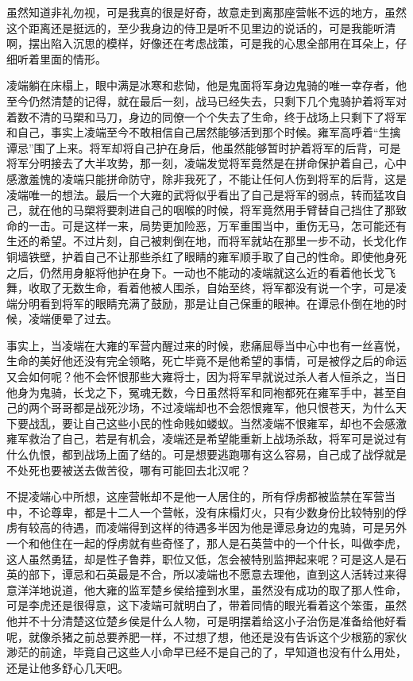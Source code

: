虽然知道非礼勿视，可是我真的很是好奇，故意走到离那座营帐不远的地方，虽然这个距离还是挺远的，至少我身边的侍卫是听不见里边的说话的，可是我能听清啊，摆出陷入沉思的模样，好像还在考虑战策，可是我的心思全部用在耳朵上，仔细听着里面的情形。

凌端躺在床榻上，眼中满是冰寒和悲恸，他是鬼面将军身边鬼骑的唯一幸存者，他至今仍然清楚的记得，就在最后一刻，战马已经失去，只剩下几个鬼骑护着将军对着数不清的马槊和马刀，身边的同僚一个个失去了生命，终于战场上只剩下了将军和自己，事实上凌端至今不敢相信自己居然能够活到那个时候。雍军高呼着“生擒谭忌”围了上来。将军却将自己护在身后，他虽然能够暂时护着将军的后背，可是将军分明接去了大半攻势，那一刻，凌端发觉将军竟然是在拼命保护着自己，心中感激羞愧的凌端只能拼命防守，除非我死了，不能让任何人伤到将军的后背，这是凌端唯一的想法。最后一个大雍的武将似乎看出了自己是将军的弱点，转而猛攻自己，就在他的马槊将要刺进自己的咽喉的时候，将军竟然用手臂替自己挡住了那致命的一击。可是这样一来，局势更加险恶，万军重围当中，重伤无马，怎可能还有生还的希望。不过片刻，自己被刺倒在地，而将军就站在那里一步不动，长戈化作铜墙铁壁，护着自己不让那些杀红了眼睛的雍军顺手取了自己的性命。即使他身死之后，仍然用身躯将他护在身下。一动也不能动的凌端就这么近的看着他长戈飞舞，收取了无数生命，看着他被人围杀，自始至终，将军都没有说一个字，可是凌端分明看到将军的眼睛充满了鼓励，那是让自己保重的眼神。在谭忌仆倒在地的时候，凌端便晕了过去。

事实上，当凌端在大雍的军营内醒过来的时候，悲痛屈辱当中心中也有一丝喜悦，生命的美好他还没有完全领略，死亡毕竟不是他希望的事情，可是被俘之后的命运又会如何呢？他不会怀恨那些大雍将士，因为将军早就说过杀人者人恒杀之，当日他身为鬼骑，长戈之下，冤魂无数，今日虽然将军和同袍都死在雍军手中，甚至自己的两个哥哥都是战死沙场，不过凌端却也不会怨恨雍军，他只恨苍天，为什么天下要战乱，要让自己这些小民的性命贱如蝼蚁。当然凌端不恨雍军，却也不会感激雍军救治了自己，若是有机会，凌端还是希望能重新上战场杀敌，将军可是说过有什么仇恨，都到战场上面了结的。可是想要逃跑哪有这么容易，自己成了战俘就是不处死也要被送去做苦役，哪有可能回去北汉呢？

不提凌端心中所想，这座营帐却不是他一人居住的，所有俘虏都被监禁在军营当中，不论尊卑，都是十二人一个营帐，没有床榻灯火，只有少数身份比较特别的俘虏有较高的待遇，而凌端得到这样的待遇多半因为他是谭忌身边的鬼骑，可是另外一个和他住在一起的俘虏就有些奇怪了，那人是石英营中的一个什长，叫做李虎，这人虽然勇猛，却是性子鲁莽，职位又低，怎会被特别监押起来呢？可是这人是石英的部下，谭忌和石英最是不合，所以凌端也不愿意去理他，直到这人活转过来得意洋洋地说道，他大雍的监军楚乡侯给撞到水里，虽然没有成功的取了那人性命，可是李虎还是很得意，这下凌端可就明白了，带着同情的眼光看着这个笨蛋，虽然他并不十分清楚这位楚乡侯是什么人物，可是明摆着给这小子治伤是准备给他好看呢，就像杀猪之前总要养肥一样，不过想了想，他还是没有告诉这个少根筋的家伙渺茫的前途，毕竟自己这些人小命早已经不是自己的了，早知道也没有什么用处，还是让他多舒心几天吧。

